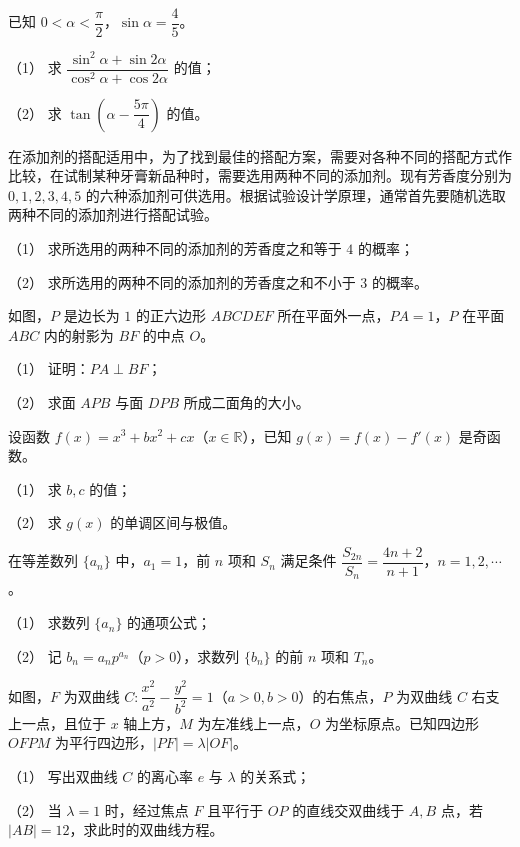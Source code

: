\begin{question}
已知 $0<\alpha<\dfrac\pi2$，$\sin\alpha=\dfrac45$。

（1） 求 $\dfrac{\sin^2\alpha+\sin2\alpha}{\cos^2\alpha+\cos2\alpha}$ 的值；

（2） 求 $\tan\left(\alpha-\dfrac{5\pi}{4}\right)$ 的值。

\end{question}
\begin{question}
在添加剂的搭配适用中，为了找到最佳的搭配方案，需要对各种不同的搭配方式作比较，在试制某种牙膏新品种时，需要选用两种不同的添加剂。现有芳香度分别为 $0,1,2,3,4,5$ 的六种添加剂可供选用。根据试验设计学原理，通常首先要随机选取两种不同的添加剂进行搭配试验。

（1） 求所选用的两种不同的添加剂的芳香度之和等于 $4$ 的概率；

（2） 求所选用的两种不同的添加剂的芳香度之和不小于 $3$ 的概率。

\Needspace{0.4\textheight}
\end{question}
\begin{question}
如图，$P$ 是边长为 $1$ 的正六边形 $ABCDEF$ 所在平面外一点，$PA=1$，$P$ 在平面 $ABC$ 内的射影为 $BF$ 的中点 $O$。

（1） 证明：$PA\perp BF$；

（2） 求面 $APB$ 与面 $DPB$ 所成二面角的大小。
\nopagebreak[4]
\begin{center}\end{center}
\nopagebreak[4]
\end{question}
\begin{question}
设函数 $f(x)=x^3+bx^2+cx$（$x\in\mathbb R$），已知 $g(x)=f(x)-f'(x)$ 是奇函数。

（1） 求 $b,c$ 的值；

（2） 求 $g(x)$ 的单调区间与极值。

\end{question}
\begin{question}
在等差数列 $\{a_n\}$ 中，$a_1=1$，前 $n$ 项和 $S_n$ 满足条件 $\dfrac{S_{2n}}{S_n}=\dfrac{4n+2}{n+1}$，$n=1,2,\cdots$。

（1） 求数列 $\{a_n\}$ 的通项公式；

（2） 记 $b_n=a_np^{a_n}$（$p>0$），求数列 $\{b_n\}$ 的前 $n$ 项和 $T_n$。

\Needspace{0.4\textheight}
\end{question}
\begin{question}
如图，$F$ 为双曲线 $C:\dfrac{x^2}{a^2}-\dfrac{y^2}{b^2}=1$（$a>0,b>0$）的右焦点，$P$ 为双曲线 $C$ 右支上一点，且位于 $x$ 轴上方，$M$ 为左准线上一点，$O$ 为坐标原点。已知四边形 $OFPM$ 为平行四边形，$|PF|=\lambda|OF|$。

（1） 写出双曲线 $C$ 的离心率 $e$ 与 $\lambda$ 的关系式；

（2） 当 $\lambda=1$ 时，经过焦点 $F$ 且平行于 $OP$ 的直线交双曲线于 $A,B$ 点，若 $|AB|=12$，求此时的双曲线方程。
\nopagebreak[4]
\begin{center}\end{center}
\nopagebreak[4]

\end{question}